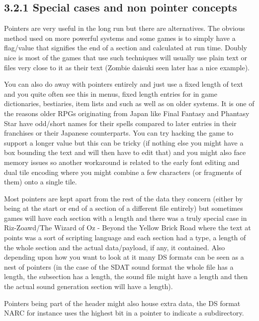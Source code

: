 \documentclass[
]{book}
\begin{document}
\hypertarget{special-cases-and-non-pointer-concepts}{%
\subsection{3.2.1 Special cases and non pointer concepts}\label{special-cases-and-non-pointer-concepts}}

Pointers are very useful in the long run but there are alternatives. The obvious method used on more powerful systems and some games is to simply have a flag/value that signifies the end of a section and calculated at run time. Doubly nice is most of the games that use such techniques will usually use plain text or files very close to it as their text (Zombie daisuki seen later has a nice example).

You can also do away with pointers entirely and just use a fixed length of text and you quite often see this in menus, fixed length entries for in game dictionaries, bestiaries, item lists and such as well as on older systems. It is one of the reasons older RPGs originating from Japan like Final Fantasy and Phantasy Star have odd/short names for their spells compared to later entries in their franchises or their Japanese counterparts. You can try hacking the game to support a longer value but this can be tricky (if nothing else you might have a box bounding the text and will then have to edit that) and you might also face memory issues so another workaround is related to the early font editing and dual tile encoding where you might combine a few characters (or fragments of them) onto a single tile.

Most pointers are kept apart from the rest of the data they concern (either by being at the start or end of a section of a different file entirely) but sometimes games will have each section with a length and there was a truly special case in Riz-Zoawd/The Wizard of Oz - Beyond the Yellow Brick Road where the text at points was a sort of scripting language and each section had a type, a length of the whole section and the actual data/payload, if any, it contained. Also depending upon how you want to look at it many DS formats can be seen as a nest of pointers (in the case of the SDAT sound format the whole file has a length, the subsection has a length, the sound file might have a length and then the actual sound generation section will have a length).

Pointers being part of the header might also house extra data, the DS format NARC for instance uses the highest bit in a pointer to indicate a subdirectory.
\end{document}
